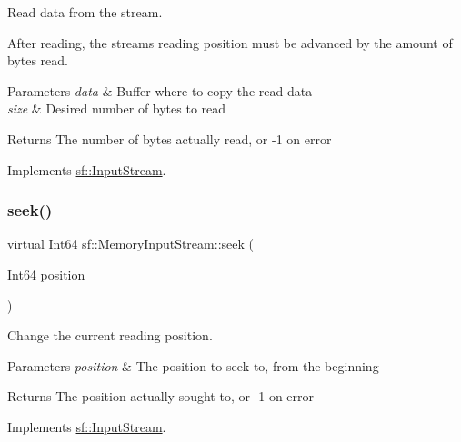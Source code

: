 Read data from the stream. 

After reading, the stream\textquotesingle{}s reading position must be advanced by the amount of bytes read.


\begin{DoxyParams}{Parameters}
{\em data} & Buffer where to copy the read data \\
\hline
{\em size} & Desired number of bytes to read\\
\hline
\end{DoxyParams}
\begin{DoxyReturn}{Returns}
The number of bytes actually read, or -\/1 on error 
\end{DoxyReturn}


Implements \hyperlink{classsf_1_1_input_stream_a8dd89c74c1acb693203f50e750c6ae53}{sf\+::\+Input\+Stream}.

\mbox{\label{classsf_1_1_memory_input_stream_aa2ac8fda2bdb4c95248ae90c71633034}} 
\subsubsection{\texorpdfstring{seek()}{seek()}}
{\footnotesize\ttfamily virtual Int64 sf\+::\+Memory\+Input\+Stream\+::seek (\begin{DoxyParamCaption}\item[{Int64}]{position }\end{DoxyParamCaption})\hspace{0.3cm}{\ttfamily [virtual]}}



Change the current reading position. 


\begin{DoxyParams}{Parameters}
{\em position} & The position to seek to, from the beginning\\
\hline
\end{DoxyParams}
\begin{DoxyReturn}{Returns}
The position actually sought to, or -\/1 on error 
\end{DoxyReturn}


Implements \hyperlink{classsf_1_1_input_stream_a76aba8e5d5cf9b1c5902d5e04f7864fc}{sf\+::\+Input\+Stream}.

\mbox{\label{classsf_1_1_memory_input_stream_a7ad4bdf721f29de8f66421ff29e23ee4}} 
